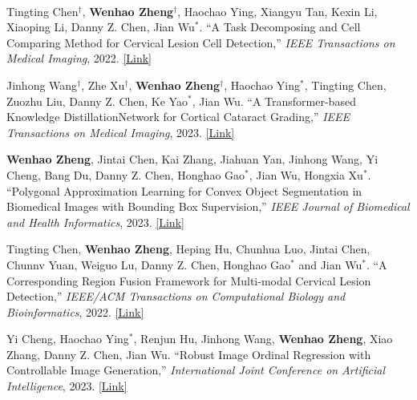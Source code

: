 
\begin{cventries}

    \cventry
    {} %
    {\ } %
    {\ } %
    {} %
    {
        \vspace{-8mm}
        \begin{cvitemize2}
            \item Tingting Chen$^\dagger$, \textbf{Wenhao Zheng$^\dagger$}, Haochao Ying, Xiangyu Tan, Kexin Li, Xiaoping Li, Danny Z. Chen, Jian Wu$^*$. ``A Task Decomposing and Cell Comparing Method for Cervical Lesion Cell Detection,'' \textit{IEEE Transactions on Medical Imaging}, 2022. \href{https://ieeexplore.ieee.org/document/9744114}{\textcolor{link}{[Link]}}
            \vspace{1mm}
            \item Jinhong Wang$^\dagger$, Zhe Xu$^\dagger$, \textbf{Wenhao Zheng$^\dagger$}, Haochao Ying$^*$, Tingting Chen, Zuozhu Liu, Danny Z. Chen, Ke Yao$^*$, Jian Wu. ``A Transformer-based Knowledge DistillationNetwork for Cortical Cataract Grading,'' \textit{IEEE Transactions on Medical Imaging}, 2023. \href{https://ieeexplore.ieee.org/abstract/document/10294274}{\textcolor{link}{[Link]}}
            \vspace{1mm}
            \item \textbf{Wenhao Zheng}, Jintai Chen, Kai Zhang, Jiahuan Yan, Jinhong Wang, Yi Cheng, Bang Du, Danny Z. Chen, Honghao Gao$^*$, Jian Wu, Hongxia Xu$^*$. ``Polygonal Approximation Learning for Convex Object Segmentation in Biomedical Images with Bounding Box Supervision,'' \textit{IEEE Journal of Biomedical and Health Informatics}, 2023. \href{https://github.com/shenmishajing/PAL}{\textcolor{link}{[Link]}}
            \vspace{1mm}
            \item Tingting Chen, \textbf{Wenhao Zheng}, Heping Hu, Chunhua Luo, Jintai Chen, Chunnv Yuan, Weiguo Lu, Danny Z. Chen, Honghao Gao$^*$ and Jian Wu$^*$. ``A Corresponding Region Fusion Framework for Multi-modal Cervical Lesion Detection,'' \textit{IEEE/ACM Transactions on Computational Biology and Bioinformatics}, 2022. \href{https://ieeexplore.ieee.org/document/9784879}{\textcolor{link}{[Link]}}
            \vspace{1mm}
            \item Yi Cheng, Haochao Ying$^*$, Renjun Hu, Jinhong Wang, \textbf{Wenhao Zheng}, Xiao Zhang, Danny Z. Chen, Jian Wu. ``Robust Image Ordinal Regression with Controllable Image Generation,'' \textit{International Joint Conference on Artificial Intelligence}, 2023. \href{https://arxiv.org/abs/2305.04213}{\textcolor{link}{[Link]}}

\end{cvitemize2}}
\end{cventries}

